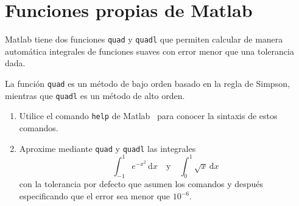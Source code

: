 \documentclass[letterpaper,11pt]{article}
\newcommand{\matlab}{{\sc Matlab} }
\begin{document}
\section{Funciones propias de \matlab}
\matlab tiene dos funciones \texttt{quad} y \texttt{quadl} que permiten calcular de manera autom\'atica integrales 
de funciones suaves con error menor que una tolerancia dada. 

La funci\'on \texttt{quad} es un m\'etodo de bajo
orden basado en la regla de Simpson, mientras que \texttt{quadl} es un m\'etodo de alto orden.

\begin{enumerate}
\item Utilice el comando \texttt{help} de \matlab\, para conocer la sintaxis de estos comandos.
\item Aproxime mediante \texttt{quad} y \texttt{quadl} las integrales 
$$
\displaystyle
\int_{-1}^1 e^{-x^2}\,\mathrm{d}x \quad \text{y} \quad \int_0^1 \sqrt{x}\,\mathrm{d}x
$$
con la tolerancia por defecto que asumen los comandos y despu\'es  especificando que el error sea menor que $10^{-6}$.
\end{enumerate}
\end{document}
